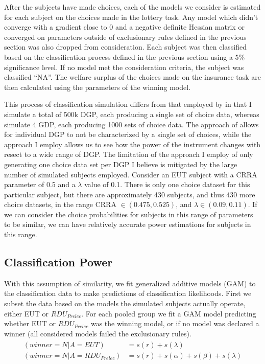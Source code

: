 \documentclass[../main.tex]{subfiles}
\begin{document}
After the subjects have made choices, each of the models we consider is estimated for each subject on the choices made in the lottery task.
Any model which didn't converge with a gradient close to 0 and a negative definite Hessian matrix or converged on parameters outside of exclusionary rules defined in the previous section was also dropped from consideration.
Each subject was then classified based on the classification process defined in the previous section using a 5\% significance level.
If no model met the consideration criteria, the subject was classified \enquote{NA}.
The welfare surplus of the choices made on the insurance task are then calculated using the parameters of the winning model.

This process of classification simulation differs from that employed by \textcite{Wilcox2015} in that I simulate a total of 500k DGP, each producing a single set of choice data, whereas \textcite{Wilcox2015} simulate 4 GDP, each producing 1000 sets of choice data.
The approach of \textcite{Wilcox2015} allows for individual DGP to not be characterized by a single set of choices, while the approach I employ allows us to see how the power of the instrument changes with resect to a wide range of DGP.
The limitation of the approach I employ of only generating one choice data set per DGP I believe is mitigated by the large number of simulated subjects employed.
Consider an EUT subject with a CRRA parameter of 0.5 and a $\lambda$ value of 0.1.
There is only one choice dataset for this particular subject, but there are approximately 430 subjects, and thus 430 more choice datasets, in the range CRRA $\in (0.475,0.525)$, and $\lambda \in (0.09, 0.11)$.
If we can consider the choice probabilities for subjects in this range of parameters to be similar, we can have relatively accurate power estimations for subjects in this range.

\subsection{\texorpdfstring{\textcite{Harrison2016}}{Harrison and Ng (2016)} Classification Power}

With this assumption of similarity, we fit generalized additive models (GAM) \parencite{Hastie1986} to the classification data to make predictions of classification likelihoods.
First we subset the data based on the models the simulated subjects actually operate, either EUT or $\mathit{RDU_{Prelec}}$.
For each pooled group we fit a GAM model predicting whether EUT or $\mathit{RDU_{Prelec}}$ was the winning model, or if no model was declared a winner (all considered models failed the exclusionary rules).
\begin{align}
	\label{eq4:GAM}
	\begin{split}
		(winner = N | A = EUT)                   &= s(r) + s(\lambda)\\
		(winner = N | A = \mathit{RDU_{Prelec}}) &= s(r) + s(\alpha) + s(\beta) + s(\lambda)
	\end{split}
\end{align}
\end{document}
